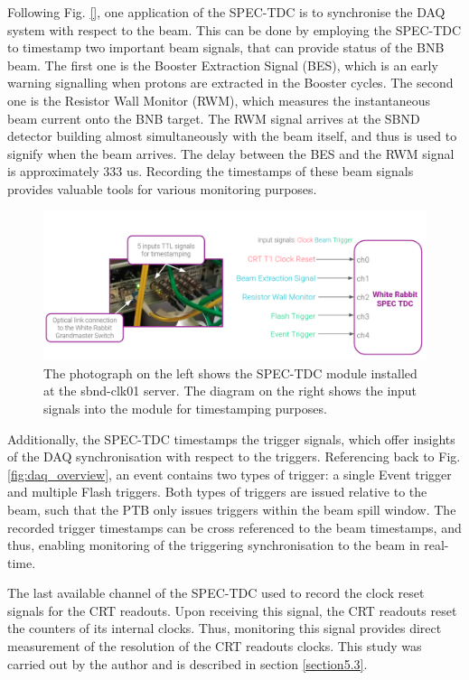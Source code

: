 Following Fig. \ref{}, one application of the SPEC-TDC is to synchronise the DAQ system with respect to the beam.
This can be done by employing the SPEC-TDC to timestamp two important beam signals, that can provide status of the BNB beam.
The first one is the Booster Extraction Signal (BES), which is an early warning signalling when protons are extracted in the Booster cycles.
The second one is the Resistor Wall Monitor (RWM), which measures the instantaneous beam current onto the BNB target.
The RWM signal arrives at the SBND detector building almost simultaneously with the beam itself, and thus is used to signify when the beam arrives.
The delay between the BES and the RWM signal is approximately 333 us.
Recording the timestamps of these beam signals provides valuable tools for various monitoring purposes. 

\begin{figure}[htbp!] 
\centering    
\includegraphics[width=1.0\textwidth]{SPEC_TDC}
\caption[SPEC_TDC]{
The photograph on the left shows the SPEC-TDC module installed at the sbnd-clk01 server.
The diagram on the right shows the input signals into the module for timestamping purposes.
}
\label{fig:SPEC_TDC}
\end{figure}

Additionally, the SPEC-TDC timestamps the trigger signals, which offer insights of the DAQ synchronisation with respect to the triggers. 
Referencing back to Fig. \ref{fig:daq_overview}, an event contains two types of trigger: a single Event trigger and multiple Flash triggers. 
Both types of triggers are issued relative to the beam, such that the PTB only issues triggers within the beam spill window.   
The recorded trigger timestamps can be cross referenced to the beam timestamps, and thus, enabling monitoring of the triggering synchronisation to the beam in real-time.

The last available channel of the SPEC-TDC used to record the clock reset signals for the CRT readouts. 
Upon receiving this signal, the CRT readouts reset the counters of its internal clocks.
Thus, monitoring this signal provides direct measurement of the resolution of the CRT readouts clocks.
This study was carried out by the author and is described in section \ref{section5.3}.

